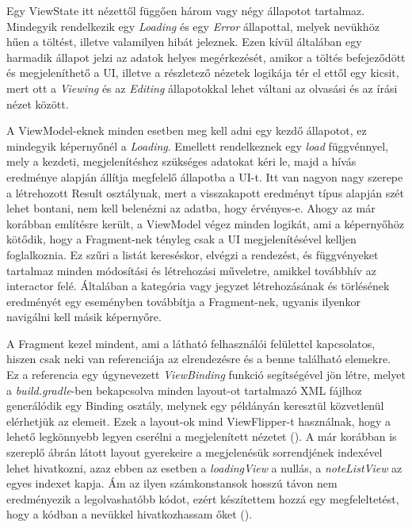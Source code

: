 Egy ViewState itt nézettől függően három vagy négy állapotot tartalmaz. Mindegyik rendelkezik egy \emph{Loading} és egy \emph{Error} állapottal, melyek nevükhöz hűen a töltést, illetve valamilyen hibát jeleznek. Ezen kívül általában egy harmadik állapot jelzi az adatok helyes megérkezését, amikor a töltés befejeződött és megjeleníthető a UI, illetve a részletező nézetek logikája tér el ettől egy kicsit, mert ott a \emph{Viewing} és az \emph{Editing} állapotokkal lehet váltani az olvasási és az írási nézet között. 

A ViewModel-eknek minden esetben meg kell adni egy kezdő állapotot, ez mindegyik képernyőnél a \emph{Loading}. Emellett rendelkeznek egy \emph{load} függvénnyel, mely a kezdeti, megjelenítéshez szükséges adatokat kéri le, majd a hívás eredménye alapján állítja megfelelő állapotba a UI-t. Itt van nagyon nagy szerepe a létrehozott Result osztálynak, mert a visszakapott eredményt típus alapján szét lehet bontani, nem kell belenézni az adatba, hogy érvényes-e. Ahogy az már korábban említésre került, a ViewModel végez minden logikát, ami a képernyőhöz kötődik, hogy a Fragment-nek tényleg csak a UI megjelenítésével kelljen foglalkoznia. Ez szűri a listát kereséskor, elvégzi a rendezést, és függvényeket tartalmaz minden módosítási és létrehozási műveletre, amikkel továbbhív az interactor felé. Általában a kategória vagy jegyzet létrehozásának és törlésének eredményét egy eseményben továbbítja a Fragment-nek, ugyanis ilyenkor navigálni kell másik képernyőre. 

A Fragment kezel mindent, ami a látható felhasználói felülettel kapcsolatos, hiszen csak neki van referenciája az elrendezésre és a benne található elemekre. Ez a referencia egy úgynevezett \emph{ViewBinding} funkció segítségével jön létre, melyet a \emph{build.gradle}-ben bekapcsolva minden layout-ot tartalmazó XML fájlhoz generálódik egy Binding osztály, melynek egy példányán keresztül közvetlenül elérhetjük az elemeit. Ezek a layout-ok mind ViewFlipper-t használnak, hogy a lehető legkönnyebb legyen cserélni a megjelenített nézetet (). A már korábban is szereplő ábrán látott layout gyerekeire a megjelenésük sorrendjének indexével lehet hivatkozni, azaz ebben az esetben a \emph{loadingView} a nullás, a \emph{noteListView} az egyes indexet kapja. Ám az ilyen számkonstansok hosszú távon nem eredményezik a legolvashatóbb kódot, ezért készítettem hozzá egy megfeleltetést, hogy a kódban a nevükkel hivatkozhassam őket ().


